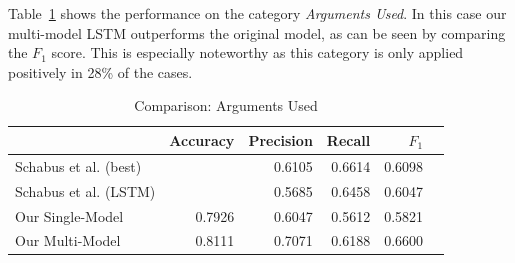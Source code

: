 \documentclass[11pt,a4paper]{article}
\begin{document}
Table~\ref{tab:results:arguments_used} shows the performance on the category \textit{Arguments Used}. In this case our multi-model LSTM outperforms the original model, as can be seen by comparing the $F_1$ score. This is especially noteworthy as this category is only applied positively in 28\% of the cases.  
\begin{table}[h!]
	\centering\scriptsize
	\begin{tabular}{l r r r r r}
		& Accuracy & Precision & Recall & $F_1$ \\
		\hline
		Schabus et al. (best) & & 0.6105 & 0.6614 & 0.6098 \\
		Schabus et al. (LSTM) & & 0.5685 & 0.6458 & 0.6047\\
		\hline
		Our Single-Model & 0.7926 & 0.6047 & 0.5612 & 0.5821 \\
		Our Multi-Model & 0.8111 & 0.7071 & 0.6188 & 0.6600 \\
	\end{tabular}
	\caption{Comparison: Arguments Used}
	\label{tab:results:arguments_used}
\end{table}
\end{document}
